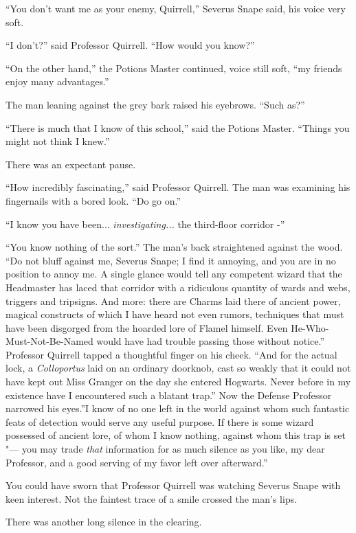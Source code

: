 ``You don't want me as your enemy, Quirrell,'' Severus Snape said, his
voice very soft.

``I don't?'' said Professor Quirrell. ``How would you know?''

``On the other hand,'' the Potions Master continued, voice still soft,
``my friends enjoy many advantages.''

The man leaning against the grey bark raised his eyebrows. ``Such as?''

``There is much that I know of this school,'' said the Potions Master.
``Things you might not think I knew.''

There was an expectant pause.

``How incredibly fascinating,'' said Professor Quirrell. The man was
examining his fingernails with a bored look. ``Do go on.''

``I know you have been... \emph{investigating...} the
third-floor corridor -''

``You know nothing of the sort.'' The man's back straightened against
the wood. ``Do not bluff against me, Severus Snape; I find it annoying,
and you are in no position to annoy me. A single glance would tell any
competent wizard that the Headmaster has laced that corridor with a
ridiculous quantity of wards and webs, triggers and tripsigns. And more:
there are Charms laid there of ancient power, magical constructs of
which I have heard not even rumors, techniques that must have been
disgorged from the hoarded lore of Flamel himself. Even
He-Who-Must-Not-Be-Named would have had trouble passing those without
notice.'' Professor Quirrell tapped a thoughtful finger on his cheek.
``And for the actual lock, a \emph{Colloportus} laid on an ordinary
doorknob, cast so weakly that it could not have kept out Miss Granger on
the day she entered Hogwarts. Never before in my existence have I
encountered such a blatant trap.'' Now the Defense Professor narrowed
his eyes.''I know of no one left in the world against whom such
fantastic feats of detection would serve any useful purpose. If there is
some wizard possessed of ancient lore, of whom I know nothing, against
whom this trap is set "--- you may trade \emph{that} information for as
much silence as you like, my dear Professor, and a good serving of my
favor left over afterward.''

You could have sworn that Professor Quirrell was watching Severus Snape
with keen interest. Not the faintest trace of a smile crossed the man's
lips.

There was another long silence in the clearing.

